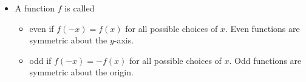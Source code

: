 \documentclass[nooutcomes]{ximera}
\begin{document}
\begin{summary}\begin{itemize}
\item A function $f$ is called
\begin{itemize}
\item even if $f(-x) = f(x)$ for all possible choices of $x$. Even functions are symmetric about the $y$-axis. 
\item odd if $f(-x) = -f(x)$ for all possible choices of $x$. Odd functions are symmetric about the origin. 
\end{itemize}
\end{itemize}\end{summary}
\end{document}
